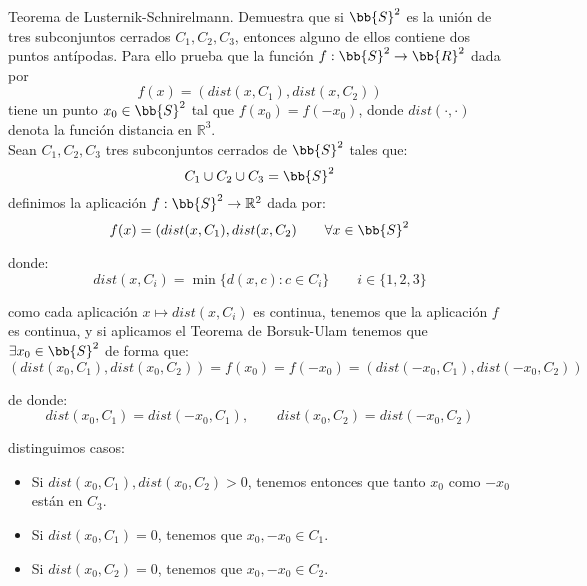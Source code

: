 \begin{ejercicio}
    Teorema de Lusternik-Schnirelmann. Demuestra que si $\bb{S}^2$ es la unión de tres subconjuntos cerrados $C_1,C_2,C_3$, entonces alguno de ellos contiene dos puntos antípodas. Para ello prueba que la función $f:\bb{S}^2\to \bb{R}^2$ dada por
    \begin{equation*}
        f(x) = (dist(x,C_1), dist(x,C_2))
    \end{equation*}
    tiene un punto $x_0\in \bb{S}^2$ tal que $f(x_0) = f(-x_0)$, donde $dist(\cdot ,\cdot )$ denota la función distancia en $\mathbb{R}^3$.\\

    \noindent
    Sean $C_1,C_2,C_3$ tres subconjuntos cerrados de $\bb{S}^2$ tales que:
    \begin{equation*}
        C_1\cup C_2\cup C_3 = \bb{S}^2
    \end{equation*}
    definimos la aplicación $f:\bb{S}^2\to \mathbb{R}^2$ dada por:
    \begin{equation*}
        f(x) = (dist(x,C_1), dist(x,C_2) \qquad \forall x\in \bb{S}^2
    \end{equation*}

    donde:
    \begin{equation*}
        dist(x,C_i) = \min\{d(x,c) : c\in C_i\} \qquad i \in \{1,2,3\}
    \end{equation*}

    como cada aplicación $x\mapsto dist(x,C_i)$ es continua, tenemos que la aplicación $f$ es continua, y si aplicamos el Teorema de Borsuk-Ulam tenemos que $\exists x_0\in \bb{S}^2$ de forma que:
    \begin{equation*}
        (dist(x_0,C_1),dist(x_0,C_2)) = f(x_0) = f(-x_0)= (dist(-x_0,C_1),dist(-x_0,C_2))
    \end{equation*}

    de donde:
    \begin{equation*}
        dist(x_0,C_1) = dist(-x_0,C_1), \qquad dist(x_0,C_2) = dist(-x_0,C_2)
    \end{equation*}

    distinguimos casos:
    \begin{itemize}
        \item Si $dist(x_0,C_1), dist(x_0,C_2)>0$, tenemos entonces que tanto $x_0$ como $-x_0$ están en $C_3$.
        \item Si $dist(x_0,C_1) =0$, tenemos que $x_0,-x_0\in C_1$.
        \item Si $dist(x_0,C_2) =0$, tenemos que $x_0,-x_0\in C_2$.
    \end{itemize}
\end{ejercicio}

